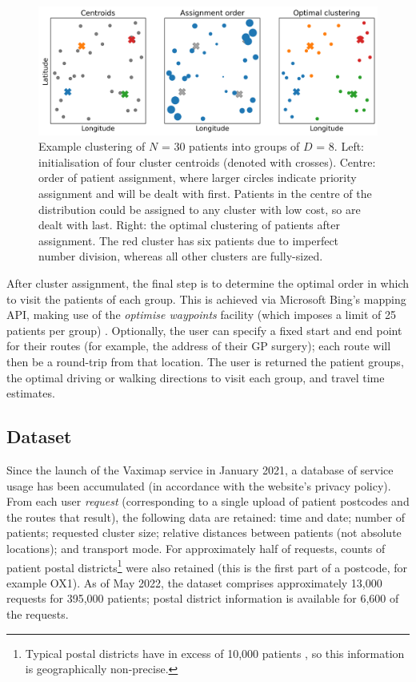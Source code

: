 \documentclass{article}
\def\vm{Vaximap}
\begin{document}
\begin{figure}[H]
\centering
\includegraphics[width=\textwidth]{clustering_demo.png}
\caption{Example clustering of $N$ = 30 patients into groups of $D$ = 8. Left: initialisation of four cluster centroids (denoted with crosses). Centre: order of patient assignment, where larger circles indicate priority assignment and will be dealt with first. Patients in the centre of the distribution could be assigned to any cluster with low cost, so are dealt with last. Right: the optimal clustering of patients after assignment. The red cluster has six patients due to imperfect number division, whereas all other clusters are fully-sized.}
\label{clustering}
\end{figure}

After cluster assignment, the final step is to determine the optimal order in which to visit the patients of each group. This is achieved via Microsoft Bing’s mapping API, making use of the \textit{optimise waypoints} facility (which imposes a limit of 25 patients per group) \cite{msbing}. Optionally, the user can specify a fixed start and end point for their routes (for example, the address of their GP surgery); each route will then be a round-trip from that location. The user is returned the patient groups, the optimal driving or walking directions to visit each group, and travel time estimates. 

\subsection{Dataset}

Since the launch of the \vm{} service in January 2021, a database of service usage has been accumulated (in accordance with the website's privacy policy). From each user \textit{request} (corresponding to a single upload of patient postcodes and the routes that result), the following data are retained: time and date; number of patients; requested cluster size; relative distances between patients (not absolute locations); and transport mode. For approximately half of requests, counts of patient postal districts\footnote{Typical postal districts have in excess of 10,000 patients \cite{OfficeforNationalStatistics}, so this information is geographically non-precise.} were also retained (this is the first part of a postcode, for example OX1). As of May 2022, the dataset comprises approximately 13,000 requests for 395,000 patients; postal district information is available for 6,600 of the requests.
\end{document}
